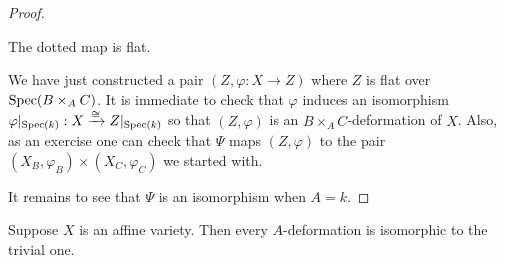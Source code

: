 \documentclass[11pt]{amsart}
\def\Spec{{\rm Spec}}
\begin{document}
\begin{proof}
\begin{lem}
The dotted map is flat.
\end{lem}

We have just constructed a pair $(Z, \varphi : X \to Z)$ where $Z$ is flat over $\Spec(B \times_A C)$. 
It is immediate to check that $\varphi$ induces an isomorphism $\varphi |_{\Spec(k)} : X \xto{\cong} Z|_{\Spec(k)}$ so that $(Z, \varphi)$ is an $B \times_A C$-deformation of $X$. 
Also, as an exercise one can check that $\Psi$ maps $(Z, \varphi)$ to the pair $(X_B, \varphi_B) \times (X_C,\varphi_C)$ we started with.

It remains to see that $\Psi$ is an isomorphism when $A = k$. 
\end{proof}

\begin{lem}
Suppose $X$ is an affine variety. 
Then every $A$-deformation is isomorphic to the trivial one.
\end{lem}
\end{document}
